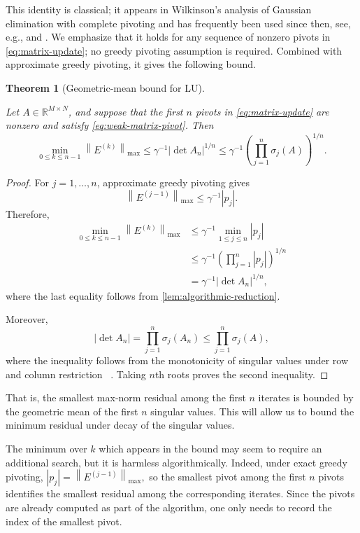 \documentclass[11pt]{article}
\newtheorem{theorem}{Theorem}[section]
\theoremstyle{definition}
\theoremstyle{remark}
\newcommand{\R}{\mathbb{R}}
\newcommand{\norm}[1]{\left\lVert #1\right\rVert}
\newcommand{\abs}[1]{\left\lvert #1\right\rvert}
\begin{document}
This identity is classical; it appears in Wilkinson's
analysis of Gaussian elimination with complete pivoting
\cite[Equation~(4.2)]{Wilkinson1961} and has frequently been used since then, see, e.g.,
\cite[Lemma~2]{Bebendorf2000} and
\cite[Equation~(3.1)]{Townsend2016}.
We emphasize that it holds for any sequence of nonzero pivots in
\eqref{eq:matrix-update}; no greedy pivoting assumption is required.
Combined with approximate greedy pivoting, it gives the following bound.

\begin{theorem}[Geometric-mean bound for LU]
\label{thm:matrix-convergence}

Let $A\in\R^{M\times N}$, and suppose that the first $n$ pivots in
\eqref{eq:matrix-update} are nonzero and satisfy
\eqref{eq:weak-matrix-pivot}. Then
\begin{equation*}
    \min_{0\le k\le n-1}\norm{E^{(k)}}_{\max}
    \le
    \gamma^{-1}\abs{\det A_n}^{1/n}
    \le
    \gamma^{-1}
    \left(\prod_{j=1}^n\sigma_j(A)\right)^{1/n}.
\end{equation*}
\end{theorem}

\begin{proof}
For $j=1,\ldots,n$, approximate greedy pivoting gives
\[
    \norm{E^{(j-1)}}_{\max}
    \le
    \gamma^{-1}\abs{p_j}.
\]
Therefore,
\begin{align*}
    \min_{0\le k\le n-1}\norm{E^{(k)}}_{\max}
    &\le
    \gamma^{-1}\min_{1\le j\le n}\abs{p_j}\\
    &\le
    \gamma^{-1}
    \left(\prod_{j=1}^n\abs{p_j}\right)^{1/n}\\
    &=
    \gamma^{-1}\abs{\det A_n}^{1/n},
\end{align*}
where the last equality follows from
\cref{lem:algorithmic-reduction}.

Moreover,
\[
    \abs{\det A_n}
    =
    \prod_{j=1}^n\sigma_j(A_n)
    \le
    \prod_{j=1}^n\sigma_j(A),
\]
where the inequality follows from the monotonicity of singular
values under row and column restriction~
\cite[Corollary~7.3.6]{HornJohnson2013}.
Taking $n$th roots proves the second inequality.
\end{proof}

That is, the smallest max-norm residual among the first $n$ iterates is
bounded by the geometric mean of the first $n$ singular values. This will allow us to bound the minimum residual under decay of the singular values.

The minimum over $k$ which appears in the bound may seem to require an additional search, but it is
harmless algorithmically. Indeed, under exact greedy pivoting,
$
    \abs{p_j}=\norm{E^{(j-1)}}_{\max},
$
so the smallest pivot among the first $n$ pivots identifies the smallest
residual among the corresponding iterates. Since the pivots are already
computed as part of the algorithm, one only needs to record the index of
the smallest pivot.
\end{document}
